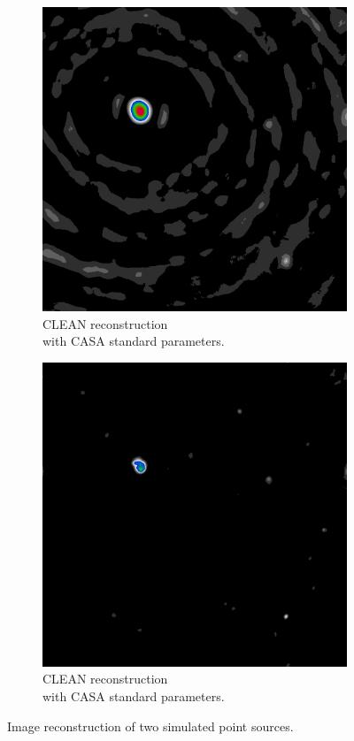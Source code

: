 \begin{figure}[h]
\begin{subfigure}[b]{0.3\linewidth}
	\includegraphics[width=\linewidth]{./chapters/01.intro/mk2/dirty.png}
	\caption{CLEAN reconstruction \\with CASA standard parameters.}
	\label{results:points:tclean}
	\end{subfigure}
	\begin{subfigure}[b]{0.3\linewidth}
		\includegraphics[width=\linewidth]{./chapters/01.intro/mk2/clean.png}
		\caption{CLEAN reconstruction \\with CASA standard parameters.}
		\label{results:points:tclean}
	\end{subfigure}

	
	\caption{Image reconstruction of two simulated point sources.}
	\label{results:points}
\end{figure}




